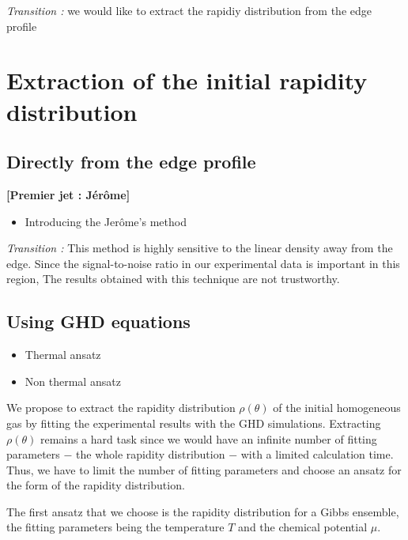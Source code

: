 \documentclass[submission, Phys]{SciPost}
\begin{document}
\textit{Transition : } we would like to extract the rapidiy distribution from the edge profile


\section{Extraction of the initial rapidity distribution}

\subsection{Directly from the edge profile}
{\bf [Premier jet : Jérôme]}
\begin{itemize}
    \item Introducing the Jerôme's method
\end{itemize}

\textit{Transition :} This method is highly sensitive to the linear density away from the edge. Since the signal-to-noise ratio in our experimental data is important in this region, The results obtained with this technique are not trustworthy.

\subsection{Using GHD equations}

\begin{itemize}
    \item Thermal ansatz
    \item Non thermal ansatz
\end{itemize}

We propose to extract the rapidity distribution $\rho (\theta)$ of the initial homogeneous gas by fitting the experimental results with the GHD simulations. 
Extracting $\rho (\theta)$ remains a hard task since we would have an infinite number of fitting parameters $-$ the whole rapidity distribution $-$ with a limited calculation time.
Thus, we have to limit the number of fitting parameters and choose an ansatz for the form of the rapidity distribution.

The first ansatz that we choose is the rapidity distribution for a Gibbs ensemble, the fitting parameters being the temperature $T$ and the chemical potential $\mu$.
\end{document}
